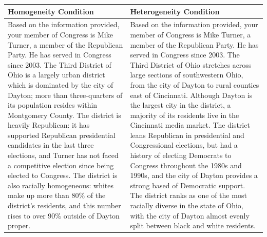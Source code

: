 \documentclass[14pt]{beamer}
\newcommand\tb{\textbf}
\begin{document}
\begin{frame}
\scriptsize
\begin{table}
	\centering
	\begin{tabulary}{\linewidth}{p{5.5cm}p{5.5cm}}
	\\
	\hline
	\tb{Homogeneity Condition}&\tb{Heterogeneity Condition} \\
	\hline
	Based on the information provided, your member of Congress is Mike Turner, a member of the Republican Party. He has served in Congress since 2003. The Third District of Ohio is a largely urban district which is dominated by the city of Dayton; more than three-quarters of its population resides within Montgomery County. The district is heavily Republican: it has supported Republican presidential candidates in the last three elections, and Turner has not faced a competitive election since being elected to Congress. The district is also racially homogeneous: whites make up more than 80\% of the district’s residents, and this number rises to over 90\% outside of Dayton proper.&Based on the information provided, your member of Congress is Mike Turner, a member of the Republican Party. He has served in Congress since 2003. The Third District of Ohio stretches across large sections of southwestern Ohio, from the city of Dayton to rural counties east of Cincinnati. Although Dayton is the largest city in the district, a majority of its residents live in the Cincinnati media market. The district leans Republican in presidential and Congressional elections, but had a history of electing Democrats to Congress throughout the 1980s and 1990s, and the city of Dayton provides a strong based of Democratic support. The district ranks as one of the most racially diverse in the state of Ohio, with the city of Dayton almost evenly split between black and white residents.\\
	\hline
	\end{tabulary}
\end{table}
\end{frame}
\end{document}
